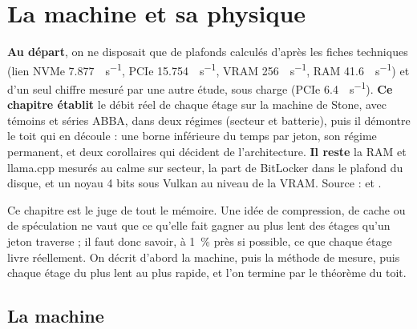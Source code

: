 \chapter{La machine et sa physique}\label{ch:machine}

\begin{origine}
\textbf{Au départ}, on ne disposait que de plafonds calculés d'après les fiches techniques (lien NVMe \SI{7.877}{\Go\per\second}, PCIe \SI{15.754}{\Go\per\second}, VRAM \SI{256}{\Go\per\second}, RAM \SI{41.6}{\Go\per\second}) et d'un seul chiffre mesuré par une autre étude, sous charge (PCIe \SI{6.4}{\Go\per\second}).
\textbf{Ce chapitre établit} le débit réel de chaque étage sur la machine de Stone, avec témoins et séries ABBA, dans deux régimes (secteur et batterie), puis il démontre le toit qui en découle : une borne inférieure du temps par jeton, son régime permanent, et deux corollaires qui décident de l'architecture.
\textbf{Il reste} la RAM et llama.cpp mesurés au calme sur secteur, la part de BitLocker dans le plafond du disque, et un noyau 4 bits sous Vulkan au niveau de la VRAM.
Source :  et .
\end{origine}

Ce chapitre est le juge de tout le mémoire. Une idée de compression, de cache ou de spéculation ne vaut que ce qu'elle fait gagner au plus lent des étages qu'un jeton traverse ; il faut donc savoir, à 1~\% près si possible, ce que chaque étage livre réellement. On décrit d'abord la machine, puis la méthode de mesure, puis chaque étage du plus lent au plus rapide, et l'on termine par le théorème du toit.

\section{La machine}\label{sec:machine-releve}

